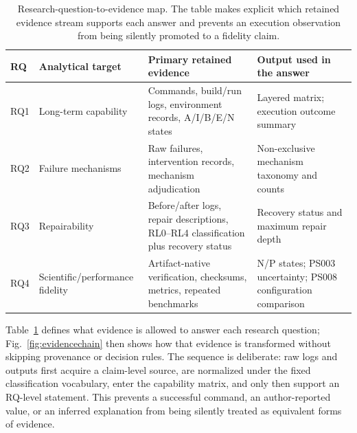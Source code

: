 \documentclass[a4paper,fleqn]{cas-dc}
\begin{document}
\begin{table}[t]
\centering
\caption{Research-question-to-evidence map. The table makes explicit which retained evidence stream supports each answer and prevents an execution observation from being silently promoted to a fidelity claim.}
\label{tab:rqmap}
\small
\setlength{\tabcolsep}{5pt}
\begin{tabularx}{\textwidth}{@{}p{}>{\raggedright\arraybackslash}p{}>{\raggedright\arraybackslash}p{}>{\raggedright\arraybackslash}X@{}}
\toprule
RQ & Analytical target & Primary retained evidence & Output used in the answer \\
\midrule
RQ1 & Long-term capability & Commands, build/run logs, environment records, A/I/B/E/N states & Layered matrix; execution outcome summary \\
RQ2 & Failure mechanisms & Raw failures, intervention records, mechanism adjudication & Non-exclusive mechanism taxonomy and counts \\
RQ3 & Repairability & Before/after logs, repair descriptions, RL0--RL4 classification plus recovery status & Recovery status and maximum repair depth \\
RQ4 & Scientific/performance fidelity & Artifact-native verification, checksums, metrics, repeated benchmarks & N/P states; PS003 uncertainty; PS008 configuration comparison \\
\bottomrule
\end{tabularx}
\end{table}

Table~\ref{tab:rqmap} defines what evidence is allowed to answer each research question; Fig.~\ref{fig:evidencechain} then shows how that evidence is transformed without skipping provenance or decision rules. The sequence is deliberate: raw logs and outputs first acquire a claim-level source, are normalized under the fixed classification vocabulary, enter the capability matrix, and only then support an RQ-level statement. This prevents a successful command, an author-reported value, or an inferred explanation from being silently treated as equivalent forms of evidence.
\end{document}
